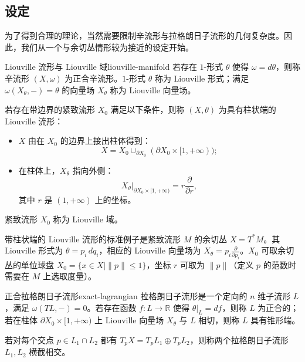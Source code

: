 
\subsection{设定}\label{subsec:fukaya-setting}
为了得到合理的理论，当然需要限制辛流形与拉格朗日子流形的几何复杂度。因此，我们从一个与余切丛情形较为接近的设定开始。

\begin{definition}{Liouville 流形与 Liouville 域}{liouville-manifold}
若存在 $1$-形式 $\theta$ 使得 $\omega=d\theta$，则称辛流形 $(X,\omega)$ 为正合辛流形。$1$-形式 $\theta$ 称为 Liouville 形式；满足 $\omega(X_\theta,-)=\theta$ 的向量场 $X_\theta$ 称为 Liouville 向量场。

若存在带边界的紧致流形 $X_0$ 满足以下条件，则称 $(X,\theta)$ 为具有柱状端的 Liouville 流形：
\begin{itemize}
  \item $X$ 由在 $X_0$ 的边界上接出柱体得到：
  \[
    X=X_0\cup_{\partial X_0}(\partial X_0\times[1,+\infty));
  \]
  \item 在柱体上，$X_\theta$ 指向外侧：
  \[
    X_\theta\big|_{\partial X_0\times[1,+\infty)}
    =r\frac{\partial}{\partial r},
  \]
  其中 $r$ 是 $(1,+\infty)$ 上的坐标。
\end{itemize}
紧致流形 $X_0$ 称为 Liouville 域。
\end{definition}

\begin{example}
带柱状端的 Liouville 流形的标准例子是紧致流形 $M$ 的余切丛 $X=T^*M$。其 Liouville 形式为 $\theta=p_i\,dq_i$，相应的 Liouville 向量场为 $X_\theta=p_i\frac{\partial}{\partial p_i}$。$X_0$ 可取余切丛的单位球盘 $X_0=\{x\in X\mid\|p\|\le1\}$，坐标 $r$ 可取为 $\|p\|$（定义 $p$ 的范数时需要在 $M$ 上选取度量）。
\end{example}

\begin{definition}{正合拉格朗日子流形}{exact-lagrangian}
拉格朗日子流形是一个定向的 $n$ 维子流形 $L$，满足 $\omega(TL,-)=0$。若存在函数 $f\colon L\to\mathbb R$ 使得 $\theta|_L=df$，则称 $L$ 为正合的；若在柱体 $\partial X_0\times[1,+\infty)$ 上 Liouville 向量场 $X_\theta$ 与 $L$ 相切，则称 $L$ 具有锥形端。

若对每个交点 $p\in L_1\cap L_2$ 都有 $T_pX=T_pL_1\oplus T_pL_2$，则称两个拉格朗日子流形 $L_1,L_2$ 横截相交。
\end{definition}

